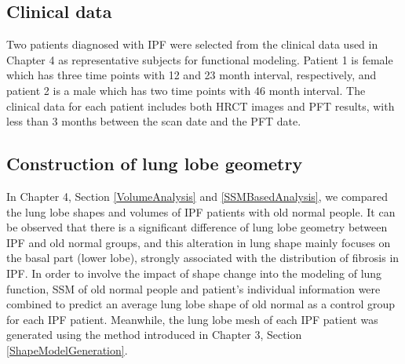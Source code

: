 \subsection{Clinical data}
Two patients diagnosed with IPF were selected from the clinical data used in Chapter 4 as representative subjects for functional modeling. Patient 1 is female which has three time points with 12 and 23 month interval, respectively, and patient 2 is a male which has two time points with 46 month interval. The clinical data for each patient includes both HRCT images and PFT results, with less than 3 months between the scan date and the PFT date. 

\subsection{Construction of lung lobe geometry}
In Chapter 4, Section \ref{VolumeAnalysis} and \ref{SSMBasedAnalysis}, we compared the lung lobe shapes and volumes of IPF patients with old normal people. It can be observed that there is a significant difference of lung lobe geometry between IPF and old normal groups, and this alteration in lung shape mainly focuses on the basal part (lower lobe), strongly associated with the distribution of fibrosis in IPF. In order to involve the impact of shape change into the modeling of lung function, SSM of old normal people and patient's individual information were combined to predict an average lung lobe shape of old normal as a control group for each IPF patient. Meanwhile, the lung lobe mesh of each IPF patient was generated using the method introduced in Chapter 3, Section \ref{ShapeModelGeneration}.

